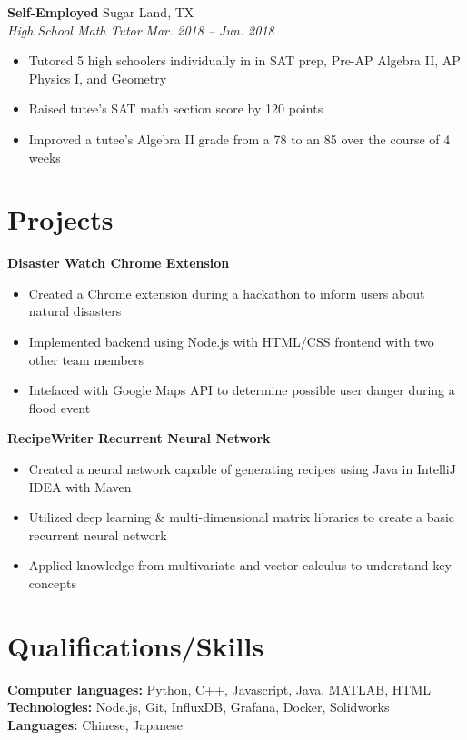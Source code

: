\documentclass[letterpaper,11pt]{article}
\begin{document}
\textbf{Self-Employed} \hfill Sugar Land, TX\\
\textit{High School Math Tutor} \hfill \textit{Mar. 2018 -- Jun. 2018}\\
\begin{itemize}[noitemsep, topsep=0pt, leftmargin=0.7cm]
  \item Tutored 5 high schoolers individually in in SAT prep, Pre-AP Algebra II, AP Physics I, and Geometry
  \item Raised tutee’s SAT math section score by 120 points
  \item Improved a tutee’s Algebra II grade from a 78 to an 85 over the course of 4 weeks
\end{itemize}
\section{Projects}
\textbf{Disaster Watch Chrome Extension}\\
\begin{itemize}[noitemsep, topsep=0pt, leftmargin=0.7cm] %
  \item Created a Chrome extension during a hackathon to inform users about natural disasters
  \item Implemented backend using Node.js with HTML/CSS frontend with two other team members
  \item Intefaced with Google Maps API to determine possible user danger during a flood event
\end{itemize}
\textbf{RecipeWriter Recurrent Neural Network}\\
\begin{itemize}[noitemsep, topsep=0pt, leftmargin=0.7cm]
  \item Created a neural network capable of generating recipes using Java in IntelliJ IDEA with Maven
  \item Utilized deep learning \& multi-dimensional matrix libraries to create a basic recurrent neural network
  \item Applied knowledge from multivariate and vector calculus to understand key concepts
\end{itemize}
\section{Qualifications/Skills}
\textbf{Computer languages:} Python, C++, Javascript, Java, MATLAB, HTML\\
\textbf{Technologies:} Node.js, Git, InfluxDB, Grafana, Docker, Solidworks\\
\textbf{Languages:} Chinese, Japanese\\
\end{document}
